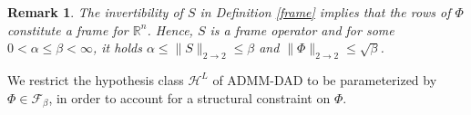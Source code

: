 \documentclass[preprint,12pt]{elsarticle}
\newtheorem{remark}[theorem]{Remark}
\newcommand{\rn}{\mathbb{R}^n}
\newcommand{\hl}{\mathcal{H}^L}
\newcommand{\opnorm}{2\rightarrow2}
\begin{document}
\begin{remark}\label{phibound}
    The invertibility of $S$ in Definition \ref{frame} implies that the rows of $\Phi$ constitute a frame for $\rn$. Hence, $S$ is a frame operator and for some $0<\alpha\leq\beta<\infty$, it holds $\alpha\leq\|S\|_{\opnorm}\leq\beta$ and $\|\Phi\|_{\opnorm}\leq\sqrt{\beta}$.
\end{remark}
We restrict the hypothesis class $\hl$ of ADMM-DAD to be parameterized by $\Phi\in\mathcal{F}_{\beta}$, in order to account for a structural constraint on $\Phi$.
\end{document}

